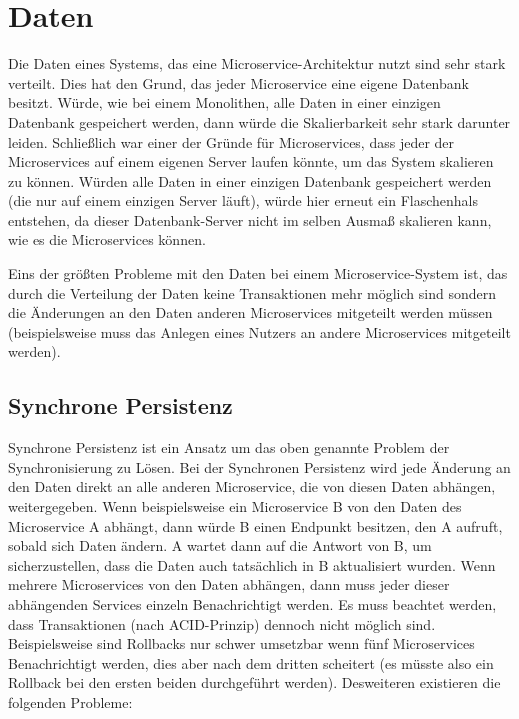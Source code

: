 
\chapter{Daten}\label{ch:Daten}

Die Daten eines Systems, das eine Microservice-Architektur nutzt sind sehr stark verteilt. Dies hat den Grund, das jeder Microservice eine eigene Datenbank besitzt. Würde, wie bei einem Monolithen, alle Daten in einer einzigen Datenbank gespeichert werden, dann würde die Skalierbarkeit sehr stark darunter leiden. Schließlich war einer der Gründe für Microservices, dass jeder der Microservices auf einem eigenen Server laufen könnte, um das System skalieren zu können. Würden alle Daten in einer einzigen Datenbank gespeichert werden (die nur auf einem einzigen Server läuft), würde hier erneut ein Flaschenhals entstehen, da dieser Datenbank-Server nicht im selben Ausmaß skalieren kann, wie es die Microservices können.

Eins der größten Probleme mit den Daten bei einem Microservice-System ist, das durch die Verteilung der Daten keine Transaktionen mehr möglich sind sondern die Änderungen an den Daten anderen Microservices mitgeteilt werden müssen (beispielsweise muss das Anlegen eines Nutzers an andere Microservices mitgeteilt werden).

\section{Synchrone Persistenz}

Synchrone Persistenz ist ein Ansatz um das oben genannte Problem der Synchronisierung zu Lösen. Bei der Synchronen Persistenz wird jede Änderung an den Daten direkt an alle anderen Microservice, die von diesen Daten abhängen, weitergegeben. Wenn beispielsweise ein Microservice B von den Daten des Microservice A abhängt, dann würde B einen Endpunkt besitzen, den A aufruft, sobald sich Daten ändern. A wartet dann auf die Antwort von B, um sicherzustellen, dass die Daten auch tatsächlich in B aktualisiert wurden. Wenn mehrere Microservices von den Daten abhängen, dann muss jeder dieser abhängenden Services einzeln Benachrichtigt werden. Es muss beachtet werden, dass Transaktionen (nach ACID-Prinzip) dennoch nicht möglich sind. Beispielsweise sind Rollbacks nur schwer umsetzbar wenn fünf Microservices Benachrichtigt werden, dies aber nach dem dritten scheitert (es müsste also ein Rollback bei den ersten beiden durchgeführt werden). Desweiteren existieren die folgenden Probleme:

